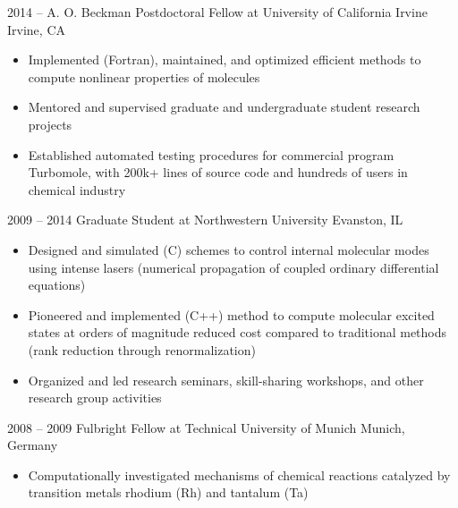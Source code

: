 \documentclass[resume]{parker-cv}
\begin{document}
\begin{entrylist}
  \entry
  {2014 -- }
  {A. O. Beckman Postdoctoral Fellow at University of California Irvine}
  {Irvine, CA}
  { \vspace{-1em}
    \begin{itemize}[leftmargin=*,nosep]
      \item Implemented (Fortran), maintained, and optimized efficient methods to compute nonlinear properties
        of molecules
      \item Mentored and supervised graduate and undergraduate student research projects
      \item Established automated testing procedures for commercial program
        Turbomole, with 200k+ lines of source code and hundreds of users in chemical industry
    \end{itemize}
  }

  \entry
  {2009 -- 2014}
  {Graduate Student at Northwestern University}
  {Evanston, IL}
  { \vspace{-1em}
    \begin{itemize}[leftmargin=*,nosep]
      \item Designed and simulated (C) schemes to control internal molecular modes
        using intense lasers (numerical propagation of coupled ordinary differential
        equations)
      \item Pioneered and implemented (C++) method to compute molecular excited states at orders of magnitude
        reduced cost compared to traditional methods (rank reduction through renormalization)
      \item Organized and led research seminars, skill-sharing workshops, and other research group activities
    \end{itemize}
  }

  \entry
  {2008 -- 2009}
  {Fulbright Fellow at Technical University of Munich}
  {Munich, Germany}
  { \vspace{-1em}
    \begin{itemize}[leftmargin=*,nosep]
      \item Computationally investigated mechanisms of chemical reactions catalyzed
      by transition metals rhodium (Rh) and tantalum (Ta)
    \end{itemize}
  }

\end{entrylist}

\end{document}
